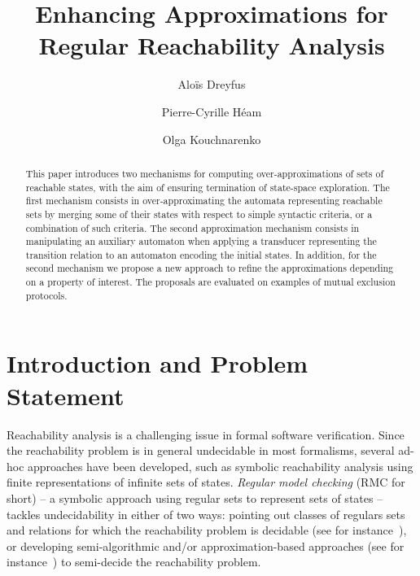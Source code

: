 \documentclass[]{llncs}
\begin{document}
\label{firstpage}


  \title{Enhancing Approximations for Regular Reachability Analysis} 

\author{Alo\"is Dreyfus \and Pierre-Cyrille H\'eam \and Olga Kouchnarenko} 
 
\maketitle
\begin{abstract}
  This paper introduces two
  mechanisms for computing over-approximations of sets of reachable states, 
  with the aim of ensuring termination of state-space exploration. 
  The first mechanism consists in over-approximating the automata
  representing reachable sets by merging some of their states 
  with respect to simple syntactic criteria, or a combination of such criteria. 
  The second approximation mechanism consists in manipulating 
  an auxiliary automaton when applying a transducer
  representing the transition relation to an automaton encoding the initial states.  
  In addition, for the second mechanism we propose
  a new approach to refine the approximations depending on a property of interest. 
  The proposals are evaluated on examples of mutual
  exclusion protocols.
\end{abstract}


\section{Introduction and Problem Statement}

Reachability analysis is a challenging issue in formal software verification. 
Since the reachability problem is in general undecidable in most
formalisms, several ad-hoc approaches have been developed, such as symbolic 
reachability analysis using finite representations of infinite sets of
states.  {\it Regular model checking} (RMC for short) -- a symbolic approach using regular sets to represent sets
of states -- tackles undecidability in either of two ways: pointing out classes of regulars sets and relations for which the
reachability problem is decidable (see for
instance~\cite{DBLP:conf/icalp/GomezGP08}), or developing semi-algorithmic and/or approximation-based
approaches (see for instance~\cite{dams_iterating_2001,dams_iterating_2002}) to
semi-decide the reachability problem.  
\end{document}

